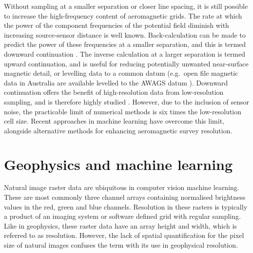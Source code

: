 Without sampling at a smaller separation or closer line spacing, it is still possible to increase the high-frequency content of aeromagnetic grids.
The rate at which the power of the component frequencies of the potential field diminish with increasing source-sensor distance is well known.
Back-calculation can be made to predict the power of these frequencies at a smaller separation, and this is termed downward continuation \parencite{bullardDeterminationMassesNecessary1948,blakelyPotentialTheoryGravity1996}.
The inverse calculation at a larger separation is termed upward continuation, and is useful for reducing potentially unwanted near-surface magnetic detail, or levelling data to a common datum (e.g.\ open file magnetic data in Australia are available levelled to the AWAGS datum \parencite{mintyAirborneGeophysicalMapping2011}).
Downward continuation offers the benefit of high-resolution data from low-resolution sampling, and is therefore highly studied \parencite{zuoDownwardContinuationTransformation2020,fediStableDownwardContinuation2002,zhangNumericalSolutionsMeanValue2018,guoPotentialFieldContinuation2020,gangImprovedStableDownward2018,pilkingtonPotentialFieldContinuation2017}.
However, due to the inclusion of sensor noise, the practicable limit of numerical methods is six times the low-resolution cell size.
Recent approaches in machine learning have overcome this limit, alongside alternative methods for enhancing aeromagnetic survey resolution.

\section{Geophysics and machine learning}
\label{sec:introdata}
Natural image raster data are ubiquitous in computer vision machine learning.
These are most commonly three channel arrays containing normalised brightness values in the red, green and blue channels.
Resolution in these rasters is typically a product of an imaging system or software defined grid with regular sampling.
Like in geophysics, these raster data have an array height and width, which is referred to as resolution.
However, the lack of spatial quantification for the pixel size of natural images confuses the term with its use in geophysical resolution.

